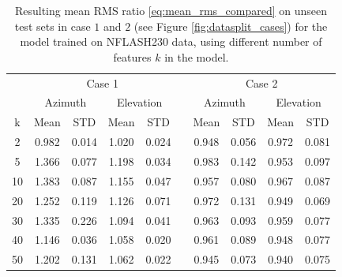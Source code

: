 \begin{table}[!htbp]
    \centering
    \caption[NFLASH230 model results for complexity $k$]{%
    Resulting mean RMS ratio \eqref{eq:mean_rms_compared} on unseen test sets in case $1$ and $2$ (see Figure \ref{fig:datasplit_cases}) for the model trained on NFLASH230 data,
    using different number of features $k$ in the model.}
    \begin{tabular}{ccccc c cccc}
        \toprule
        \multicolumn{1}{c}{} & \multicolumn{4}{c}{Case 1} & & \multicolumn{4}{c}{Case 2} \\
        \cmidrule(lr){2-5} \cmidrule(lr){7-10}
        \multicolumn{1}{c}{} & \multicolumn{2}{c}{Azimuth} & \multicolumn{2}{c}{Elevation} & & \multicolumn{2}{c}{Azimuth} & \multicolumn{2}{c}{Elevation} \\ 
        \cmidrule(lr){2-5} \cmidrule(lr){7-10}
        k & Mean & STD & Mean & STD & & Mean & STD & Mean & STD \\ 
        \midrule
         2 &     0.982 &     0.014 &     1.020 &     0.024 &  &  0.948 &     0.056 &     0.972 &     0.081 \\
         5 &     1.366 &     0.077 &     1.198 &     0.034 &  &  0.983 &     0.142 &     0.953 &     0.097 \\
        10 &     1.383 &     0.087 &     1.155 &     0.047 &  &  0.957 &     0.080 &     0.967 &     0.087 \\
        20 &     1.252 &     0.119 &     1.126 &     0.071 &  &  0.972 &     0.131 &     0.949 &     0.069 \\
        30 &     1.335 &     0.226 &     1.094 &     0.041 &  &  0.963 &     0.093 &     0.959 &     0.077 \\
        40 &     1.146 &     0.036 &     1.058 &     0.020 &  &  0.961 &     0.089 &     0.948 &     0.077 \\
        50 &     1.202 &     0.131 &     1.062 &     0.022 &  &  0.945 &     0.073 &     0.940 &     0.075 \\
        \bottomrule
    \end{tabular}
    \label{tab:results_nflash_days}
\end{table}

